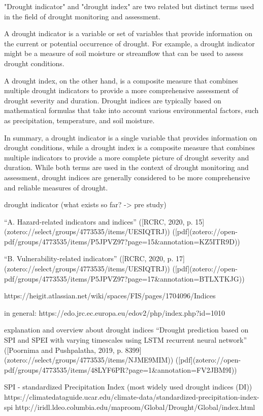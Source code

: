 {"Drought indicator" and "drought index" are two related but distinct terms used in the field of drought monitoring and assessment.

A drought indicator is a variable or set of variables that provide information on the current or potential occurrence of drought. For example, a drought indicator might be a measure of soil moisture or streamflow that can be used to assess drought conditions.

A drought index, on the other hand, is a composite measure that combines multiple drought indicators to provide a more comprehensive assessment of drought severity and duration. Drought indices are typically based on mathematical formulas that take into account various environmental factors, such as precipitation, temperature, and soil moisture.

In summary, a drought indicator is a single variable that provides information on drought conditions, while a drought index is a composite measure that combines multiple indicators to provide a more complete picture of drought severity and duration. While both terms are used in the context of drought monitoring and assessment, drought indices are generally considered to be more comprehensive and reliable measures of drought.

drought indicator (what exists so far? -> pre study)

“A. Hazard-related indicators and indices” ([RCRC, 2020, p. 15](zotero://select/groups/4773535/items/UESIQTRJ)) ([pdf](zotero://open-pdf/groups/4773535/items/P5JPVZ97?page=15&annotation=KZ5ITR9D))

“B. Vulnerability-related indicators” ([RCRC, 2020, p. 17](zotero://select/groups/4773535/items/UESIQTRJ)) ([pdf](zotero://open-pdf/groups/4773535/items/P5JPVZ97?page=17&annotation=BTLXTKJG))

https://heigit.atlassian.net/wiki/spaces/FIS/pages/1704096/Indices

in general: https://edo.jrc.ec.europa.eu/edov2/php/index.php?id=1010

explanation and overview about drought indices “Drought prediction based on SPI and SPEI with varying timescales using LSTM recurrent neural network” ([Poornima and Pushpalatha, 2019, p. 8399](zotero://select/groups/4773535/items/NJME9MIM)) ([pdf](zotero://open-pdf/groups/4773535/items/48LYF6PR?page=1&annotation=FV2JBM9I))

SPI - standardized Precipitation Index (most widely used drought indices (DI)) 
https://climatedataguide.ucar.edu/climate-data/standardized-precipitation-index-spi
http://iridl.ldeo.columbia.edu/maproom/Global/Drought/Global/index.html

}
